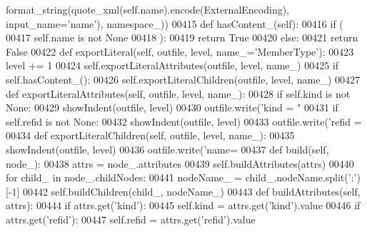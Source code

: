 \begin{DoxyCode}
{{{{{{{{{{{{{{{{{{{{{{{{{{{{{{{{{{{{{      format_string(quote_xml(self.name).encode(ExternalEncoding), input\_name=\textcolor{stringliteral}{'name'}), namespace\_))
00415     \textcolor{keyword}{def }hasContent_(self):
00416         \textcolor{keywordflow}{if} (
00417             self.name \textcolor{keywordflow}{is} \textcolor{keywordflow}{not} \textcolor{keywordtype}{None}
00418             ):
00419             \textcolor{keywordflow}{return} \textcolor{keyword}{True}
00420         \textcolor{keywordflow}{else}:
00421             \textcolor{keywordflow}{return} \textcolor{keyword}{False}
00422     \textcolor{keyword}{def }exportLiteral(self, outfile, level, name\_='MemberType'):
00423         level += 1
00424         self.exportLiteralAttributes(outfile, level, name\_)
00425         \textcolor{keywordflow}{if} self.hasContent_():
00426             self.exportLiteralChildren(outfile, level, name\_)
00427     \textcolor{keyword}{def }exportLiteralAttributes(self, outfile, level, name\_):
00428         \textcolor{keywordflow}{if} self.kind \textcolor{keywordflow}{is} \textcolor{keywordflow}{not} \textcolor{keywordtype}{None}:
00429             showIndent(outfile, level)
00430             outfile.write(\textcolor{stringliteral}{'kind = "%
00431         \textcolor{keywordflow}{if} self.refid \textcolor{keywordflow}{is} \textcolor{keywordflow}{not} \textcolor{keywordtype}{None}:
00432             showIndent(outfile, level)
00433             outfile.write(\textcolor{stringliteral}{'refid = %
00434     \textcolor{keyword}{def }exportLiteralChildren(self, outfile, level, name\_):
00435         showIndent(outfile, level)
00436         outfile.write(\textcolor{stringliteral}{'name=%
00437     \textcolor{keyword}{def }build(self, node\_):
00438         attrs = node\_.attributes
00439         self.buildAttributes(attrs)
00440         \textcolor{keywordflow}{for} child\_ \textcolor{keywordflow}{in} node\_.childNodes:
00441             nodeName\_ = child\_.nodeName.split(\textcolor{stringliteral}{':'})[-1]
00442             self.buildChildren(child\_, nodeName\_)
00443     \textcolor{keyword}{def }buildAttributes(self, attrs):
00444         \textcolor{keywordflow}{if} attrs.get(\textcolor{stringliteral}{'kind'}):
00445             self.kind = attrs.get(\textcolor{stringliteral}{'kind'}).value
00446         \textcolor{keywordflow}{if} attrs.get(\textcolor{stringliteral}{'refid'}):
00447             self.refid = attrs.get(\textcolor{stringliteral}{'refid'}).value
}}}}}}}}}}}}}}}}}}}}}}}}}}}}}}}}}}}}}}}}
\end{DoxyCode}

